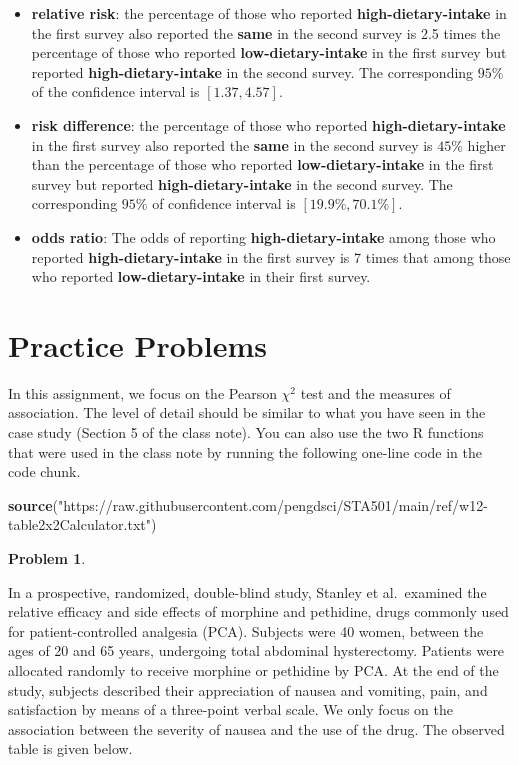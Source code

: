 \documentclass[
]{book}
\newenvironment{Shaded}{\begin{snugshade}}{\end{snugshade}}
\newcommand{\FunctionTok}[1]{\textcolor[rgb]{0.13,0.29,0.53}{\textbf{#1}}}
\newcommand{\NormalTok}[1]{#1}
\newcommand{\StringTok}[1]{\textcolor[rgb]{0.31,0.60,0.02}{#1}}
\begin{document}
\begin{itemize}
\item
  \textbf{relative risk}: the percentage of those who reported \textbf{high-dietary-intake} in the first survey also reported the \textbf{same} in the second survey is 2.5 times the percentage of those who reported \textbf{low-dietary-intake} in the first survey but reported \textbf{high-dietary-intake} in the second survey. The corresponding \(95\%\) of the confidence interval is \([1.37, 4.57]\).
\item
  \textbf{risk difference}: the percentage of those who reported \textbf{high-dietary-intake} in the first survey also reported the \textbf{same} in the second survey is \(45\%\) higher than the percentage of those who reported \textbf{low-dietary-intake} in the first survey but reported \textbf{high-dietary-intake} in the second survey. The corresponding \(95\%\) of confidence interval is \([19.9\%, 70.1\%]\).
\item
  \textbf{odds ratio}: The odds of reporting \textbf{high-dietary-intake} among those who reported \textbf{high-dietary-intake} in the first survey is 7 times that among those who reported \textbf{low-dietary-intake} in their first survey.
\end{itemize}

\hypertarget{practice-problems-4}{%
\section{Practice Problems}\label{practice-problems-4}}

In this assignment, we focus on the Pearson \(\chi^2\) test and the measures of association. The level of detail should be similar to what you have seen in the case study (Section 5 of the class note). You can also use the two R functions that were used in the class note by running the following one-line code in the code chunk.

\begin{Shaded}
\begin{Highlighting}[]
\FunctionTok{source}\NormalTok{(}\StringTok{"https://raw.githubusercontent.com/pengdsci/STA501/main/ref/w12{-}table2x2Calculator.txt"}\NormalTok{)}
\end{Highlighting}
\end{Shaded}

\textbf{Problem 1}.

In a prospective, randomized, double-blind study, Stanley et al.~examined the relative efficacy and side effects of morphine and pethidine, drugs commonly used for patient-controlled analgesia (PCA). Subjects were 40 women, between the ages of 20 and 65 years, undergoing total abdominal hysterectomy. Patients were allocated randomly to receive morphine or pethidine by PCA. At the end of the study, subjects described their appreciation of nausea and vomiting, pain, and satisfaction by means of a three-point verbal scale. We only focus on the association between the severity of nausea and the use of the drug. The observed table is given below.
\end{document}

